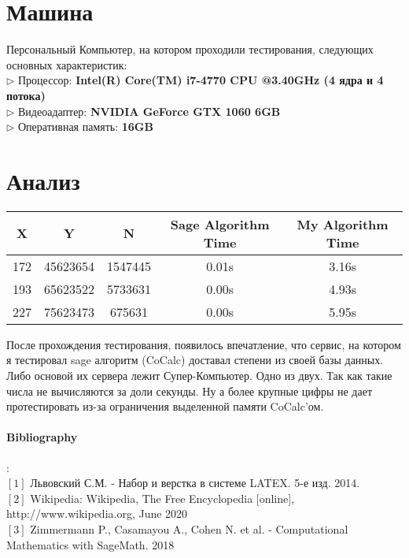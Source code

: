 \documentclass[11pt]{article}
\begin{document}
\section{Машина}
Персональный Компьютер, на котором проходили тестирования, следующих основных характеристик:
\\$\triangleright$ Процессор: \textbf{Intel(R) Core(TM) i7-4770 CPU @3.40GHz (4 ядра и 4 потока)}
\\$\triangleright$ Видеоадаптер: \textbf{NVIDIA GeForce GTX 1060 6GB}
\\$\triangleright$ Оперативная память: \textbf{16GB}

\section{Анализ}

\begin{tabular}{|c|c|c|c|c|}
\hline
X & Y & N & Sage Algorithm Time & My Algorithm Time\\
\hline
\hline
172 & 45623654 & 1547445 & 0.01s & 3.16s\\
193 & 65623522 & 5733631 & 0.00s & 4.93s\\
227 & 75623473 & 675631 & 0.00s & 5.95s\\
\hline
\end{tabular}

После прохождения тестирования, появилось впечатление, что сервис, на котором я тестировал sage алгоритм (CoCalc) доставал степени из своей базы данных. Либо основой их сервера лежит Супер-Компьютер. Одно из двух. Так как такие числа не вычисляются за доли секунды. Ну а более крупные цифры не дает протестировать из-за ограничения выделенной памяти CoCalc'ом.


\paragraph{Bibliography}:
\\ $[1]$ Львовский С.М. - Набор и верстка в системе LATEX. 5-е изд. 2014.
\\ $[2]$ Wikipedia: Wikipedia, The Free Encyclopedia [online], http://www.wikipedia.org, June 2020
\\ $[3]$ Zimmermann P., Casamayou A., Cohen N. et al. - Computational Mathematics with SageMath. 2018
\end{document}
